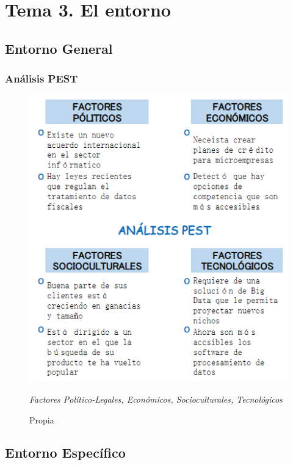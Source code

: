 \documentclass[openany,overnay,a4paper, twoside, 12pt]{book}
\begin{document}
\chapter*{Tema 3. El entorno}
\setcounter{section}{0}
\section{Entorno General}
\subsection{Análisis PEST}
\begin{figure}[h]
\centering

\includegraphics[scale = 0.7]{imagenes/PEST.png}
\renewcommand{\figurename}{Análisis PEST}
\renewcommand{\thefigure}{}
\caption{\textit{Factores Político-Legales, Económicos, Socioculturales, Tecnológicos}}
\renewcommand{\figurename}{Fuente}
\caption{Propia}
\end{figure}
\section{Entorno Específico}
\end{document}
